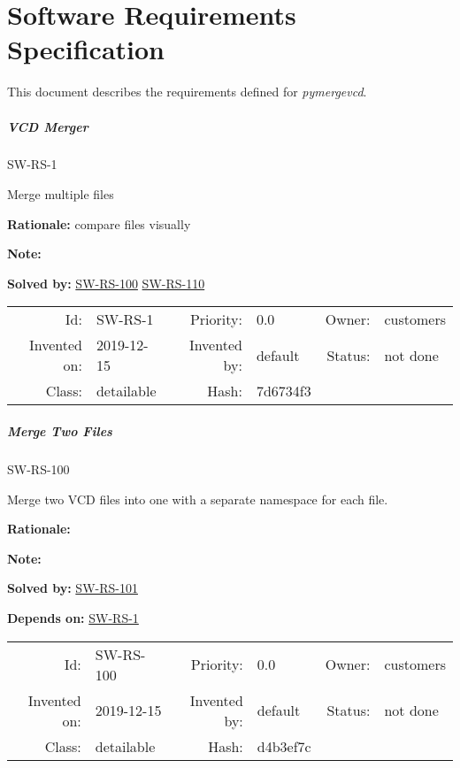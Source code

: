 

\chapter{Software Requirements Specification}

This document describes the requirements defined for \emph{pymergevcd}.

\paragraph{VCD Merger}

\hypertarget{SW-RS-1}{SW-RS-1} 
\label{SW-RS-1}

Merge multiple files

\textbf{Rationale:} compare files visually

\textbf{Note:} 

 \textbf{Solved by:}
 \hyperlink{SW-RS-100}{SW-RS-100}  \hyperlink{SW-RS-110}{SW-RS-110} 






\par{\small \begin{center}
\begin{tabular}{rlrlrl}
   Id: & SW-RS-1               & Priority: & 0.0          & Owner: & customers \\
   Invented on: & 2019-12-15 & Invented by: & default & Status: & not done \\
   Class: & detailable & Hash: & 7d6734f3
\end{tabular}\end{center}
}

\paragraph{Merge Two Files}

\hypertarget{SW-RS-100}{SW-RS-100} 
\label{SW-RS-100}

Merge two VCD files into one with a separate namespace for each file.

\textbf{Rationale:} 

\textbf{Note:} 

 \textbf{Solved by:}
 \hyperlink{SW-RS-101}{SW-RS-101} 


 \textbf{Depends on:}
 \hyperlink{SW-RS-1}{SW-RS-1} 




\par{\small \begin{center}
\begin{tabular}{rlrlrl}
   Id: & SW-RS-100               & Priority: & 0.0          & Owner: & customers \\
   Invented on: & 2019-12-15 & Invented by: & default & Status: & not done \\
   Class: & detailable & Hash: & d4b3ef7c
\end{tabular}\end{center}
}

